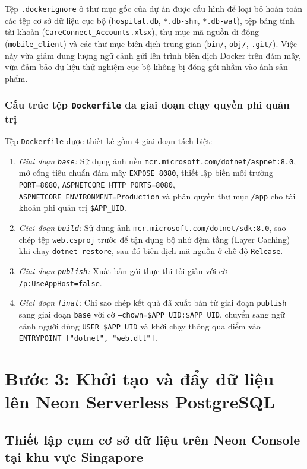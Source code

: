 Tệp \texttt{.dockerignore} ở thư mục gốc của dự án được cấu hình để loại bỏ hoàn toàn các tệp cơ sở dữ liệu cục bộ (\texttt{hospital.db}, \texttt{*.db-shm}, \texttt{*.db-wal}), tệp bảng tính tài khoản (\texttt{CareConnect\_Accounts.xlsx}), thư mục mã nguồn di động (\texttt{mobile\_client}) và các thư mục biên dịch trung gian (\texttt{bin/}, \texttt{obj/}, \texttt{.git/}). Việc này vừa giảm dung lượng ngữ cảnh gửi lên trình biên dịch Docker trên đám mây, vừa đảm bảo dữ liệu thử nghiệm cục bộ không bị đóng gói nhầm vào ảnh sản phẩm.

\subsubsection{Cấu trúc tệp \texttt{Dockerfile} đa giai đoạn chạy quyền phi quản trị}

Tệp \texttt{Dockerfile} được thiết kế gồm 4 giai đoạn tách biệt:
\begin{enumerate}
    \item \textit{Giai đoạn \texttt{base}:} Sử dụng ảnh nền \texttt{mcr.microsoft.com/dotnet/aspnet:8.0}, mở cổng tiêu chuẩn đám mây \texttt{EXPOSE 8080}, thiết lập biến môi trường \texttt{PORT=8080}, \texttt{ASPNETCORE\_HTTP\_PORTS=8080}, \texttt{ASPNETCORE\_ENVIRONMENT=Production} và phân quyền thư mục \texttt{/app} cho tài khoản phi quản trị \texttt{\$APP\_UID}.
    \item \textit{Giai đoạn \texttt{build}:} Sử dụng ảnh \texttt{mcr.microsoft.com/dotnet/sdk:8.0}, sao chép tệp \texttt{web.csproj} trước để tận dụng bộ nhớ đệm tầng (Layer Caching) khi chạy \texttt{dotnet restore}, sau đó biên dịch mã nguồn ở chế độ \texttt{Release}.
    \item \textit{Giai đoạn \texttt{publish}:} Xuất bản gói thực thi tối giản với cờ \texttt{/p:UseAppHost=false}.
    \item \textit{Giai đoạn \texttt{final}:} Chỉ sao chép kết quả đã xuất bản từ giai đoạn \texttt{publish} sang giai đoạn \texttt{base} với cờ \texttt{--chown=\$APP\_UID:\$APP\_UID}, chuyển sang ngữ cảnh người dùng \texttt{USER \$APP\_UID} và khởi chạy thông qua điểm vào \texttt{ENTRYPOINT ["dotnet", "web.dll"]}.
\end{enumerate}

\section{Bước 3: Khởi tạo và đẩy dữ liệu lên Neon Serverless PostgreSQL}

\subsection{Thiết lập cụm cơ sở dữ liệu trên Neon Console tại khu vực Singapore}

